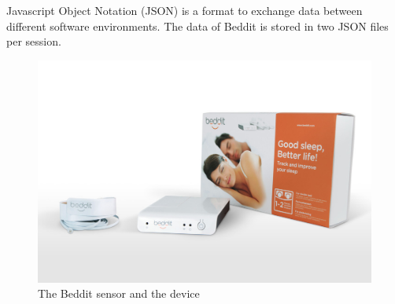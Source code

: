 			Javascript Object Notation (JSON) is a format to exchange data between different software environments. The data of Beddit is stored in two JSON files per session.

			\begin{figure}[h]
				\centering
					\includegraphics[scale=0.25]{beddit.jpg}
					
					\caption{The Beddit sensor and the device \cite{beddit}}

			\end{figure}



